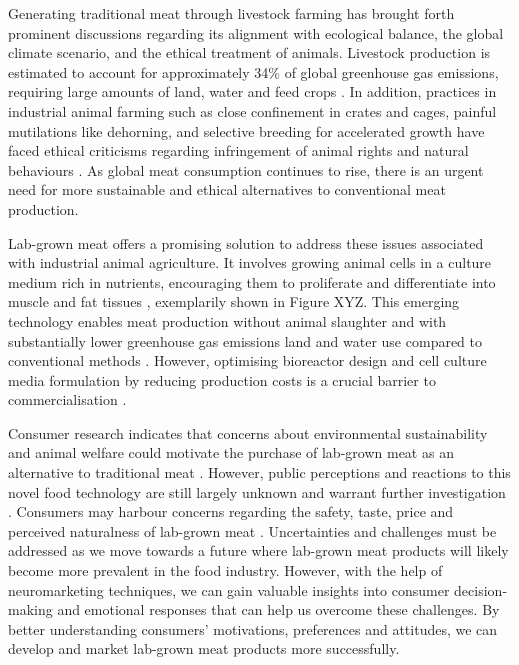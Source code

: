 \documentclass[10pt]{article}
\begin{document}
\begin{sloppypar}
  Generating traditional meat through livestock farming has brought forth prominent discussions regarding its alignment with ecological balance, the global climate scenario, and the ethical treatment of animals. Livestock production is estimated to account for approximately 34\% of global greenhouse gas emissions, requiring large amounts of land, water and feed crops \citep{tuomisto_environmental_2011}. In addition, practices in industrial animal farming such as close confinement in crates and cages, painful mutilations like dehorning, and selective breeding for accelerated growth have faced ethical criticisms regarding infringement of animal rights and natural behaviours \citep{stephens_bringing_2018}. As global meat consumption continues to rise, there is an urgent need for more sustainable and ethical alternatives to conventional meat production.



  Lab-grown meat offers a promising solution to address these issues associated with industrial animal agriculture. It involves growing animal cells in a culture medium rich in nutrients, encouraging them to proliferate and differentiate into muscle and fat tissues \citep{datar_possibilities_2010}, exemplarily shown in Figure XYZ. This emerging technology enables meat production without animal slaughter and with substantially lower greenhouse gas emissions land and water use compared to conventional methods \citep{tuomisto_environmental_2011}. However, optimising bioreactor design and cell culture media formulation by reducing production costs is a crucial barrier to commercialisation \citep{specht_opportunities_2018}.

  Consumer research indicates that concerns about environmental sustainability and animal welfare could motivate the purchase of lab-grown meat as an alternative to traditional meat \citep{circus_exploring_2018}. However, public perceptions and reactions to this novel food technology are still largely unknown and warrant further investigation \citep{verbeke_would_2015}. Consumers may harbour concerns regarding the safety, taste, price and perceived naturalness of lab-grown meat \citep{bryant_consumer_2018}. Uncertainties and challenges must be addressed as we move towards a future where lab-grown meat products will likely become more prevalent in the food industry. However, with the help of neuromarketing techniques, we can gain valuable insights into consumer decision-making and emotional responses that can help us overcome these challenges. By better understanding consumers’ motivations, preferences and attitudes, we can develop and market lab-grown meat products more successfully.


\end{sloppypar}
\end{document}
